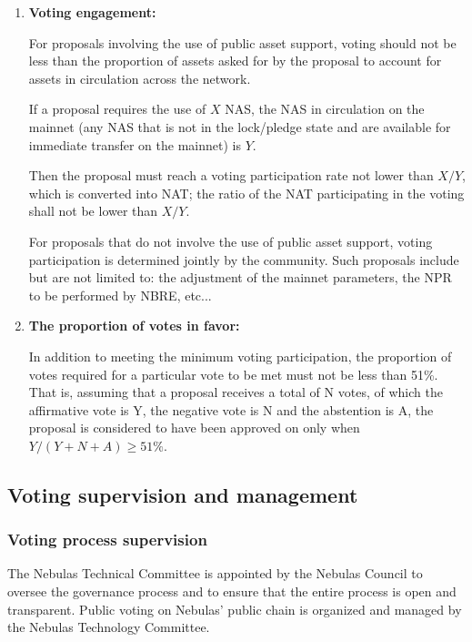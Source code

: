 \begin{enumerate}
	\item

	\textbf{Voting engagement:}

	For proposals involving the use of public asset support, voting should not be less than the proportion of assets asked for by the proposal to account for assets in circulation across the network.

	If a proposal requires the use of $X$ NAS, the NAS in circulation on the
	mainnet (any NAS that is not in the lock/pledge state and are available for
	immediate transfer on the mainnet) is $Y$.

	Then the proposal must reach a voting participation rate not lower than
	$X/Y$, which is converted into NAT; the ratio of the NAT participating in
	the voting shall not be lower than $X/Y$.

	For proposals that do not involve the use of public asset support, voting participation is determined jointly by the community. Such proposals include but are not limited to: the adjustment of the mainnet parameters, the NPR to be performed by NBRE, etc...

	\item

	\textbf{The proportion of votes in favor:}

	In addition to meeting the minimum voting participation, the proportion of
	votes required for a particular vote to be met must not be less than 51\%.
	That is, assuming that a proposal receives a total of N votes, of which the
	affirmative vote is Y, the negative vote is N and the abstention is A, the
	proposal is considered to have been approved on only when $Y/(Y+N+A) \ge
	51\%$.

\end{enumerate}

\subsection{Voting supervision and management}

\subsubsection{Voting process supervision}
\label{second-vote}

The Nebulas Technical Committee is appointed by the Nebulas Council to oversee the governance process and to ensure that the entire process is open and transparent. Public voting on Nebulas' public chain is organized and managed by the Nebulas Technology Committee.

